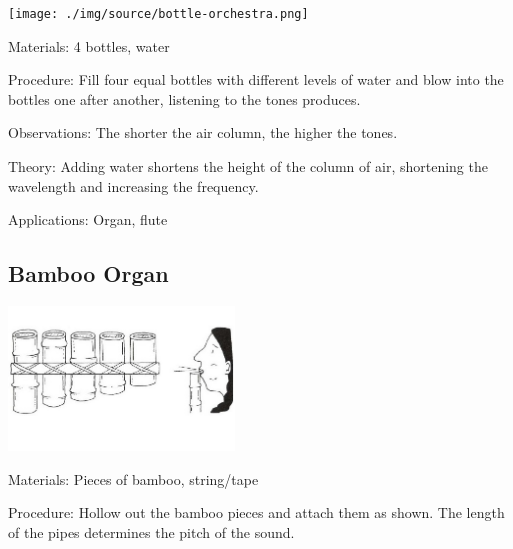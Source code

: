 \begin{multicols}{2}
\begin{center}
\texttt{[image: ./img/source/bottle-orchestra.png]}
\end{center}

\begin{description*}
\item[Materials:]{4 bottles, water}
\item[Procedure:]{Fill four equal bottles with different levels of water and blow into the bottles one after another, listening to the tones produces.}
\item[Observations:]{The shorter the air column, the higher the tones.}
\item[Theory:]{Adding water shortens the height of the column of air, shortening the wavelength and increasing the frequency.}
\item[Applications:]{Organ, flute}
\end{description*}

\columnbreak

\subsection{Bamboo Organ}

\begin{center}
\includegraphics[width=0.45\textwidth]{./img/vso/bamboo-organ.jpg}
\end{center}

\begin{description*}
\item[Materials:]{Pieces of bamboo, string/tape}
\item[Procedure:]{Hollow out the bamboo pieces and attach them as shown. The length of the pipes determines the pitch of the sound.}
\end{description*}


\end{multicols}
